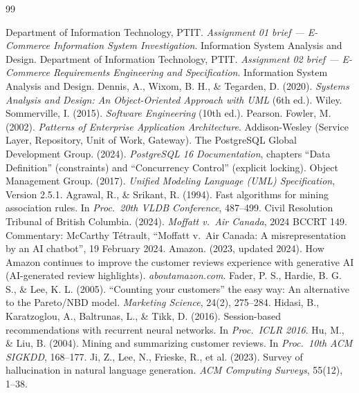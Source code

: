\documentclass[11pt,a4paper,oneside]{extreport}
\newif\ifshowvtwo
\newcommand{\vtwocolor}{\ifshowvtwo\color{red}\fi}
\begin{document}
\renewcommand{\bibname}{References}
\begin{thebibliography}{99}
 Department of Information Technology, PTIT. \emph{Assignment 01 brief --- E-Commerce Information System Investigation}. Information System Analysis and Design.
 Department of Information Technology, PTIT. \emph{Assignment 02 brief --- E-Commerce Requirements Engineering and Specification}. Information System Analysis and Design.
 Dennis, A., Wixom, B. H., \& Tegarden, D. (2020). \emph{Systems Analysis and Design: An Object-Oriented Approach with UML} (6th ed.). Wiley.
 Sommerville, I. (2015). \emph{Software Engineering} (10th ed.). Pearson.
 Fowler, M. (2002). \emph{Patterns of Enterprise Application Architecture}. Addison-Wesley (Service Layer, Repository, Unit of Work, Gateway).
 The PostgreSQL Global Development Group. (2024). \emph{PostgreSQL 16 Documentation}, chapters ``Data Definition'' (constraints) and ``Concurrency Control'' (explicit locking).
 Object Management Group. (2017). \emph{Unified Modeling Language (UML) Specification}, Version 2.5.1.
{\vtwocolor
{} Agrawal, R., \& Srikant, R. (1994). Fast algorithms for mining association rules. In \emph{Proc.\ 20th VLDB Conference}, 487--499.
 Civil Resolution Tribunal of British Columbia. (2024). \emph{Moffatt v.\ Air Canada}, 2024 BCCRT 149. Commentary: McCarthy T\'etrault, ``Moffatt v.\ Air Canada: A misrepresentation by an AI chatbot'', 19 February 2024.
 Amazon. (2023, updated 2024). How Amazon continues to improve the customer reviews experience with generative AI (AI-generated review highlights). \emph{aboutamazon.com}.
 Fader, P. S., Hardie, B. G. S., \& Lee, K. L. (2005). ``Counting your customers'' the easy way: An alternative to the Pareto/NBD model. \emph{Marketing Science}, 24(2), 275--284.
 Hidasi, B., Karatzoglou, A., Baltrunas, L., \& Tikk, D. (2016). Session-based recommendations with recurrent neural networks. In \emph{Proc.\ ICLR 2016}.
 Hu, M., \& Liu, B. (2004). Mining and summarizing customer reviews. In \emph{Proc.\ 10th ACM SIGKDD}, 168--177.
 Ji, Z., Lee, N., Frieske, R., et al. (2023). Survey of hallucination in natural language generation. \emph{ACM Computing Surveys}, 55(12), 1--38.
}
\end{thebibliography}
\end{document}
